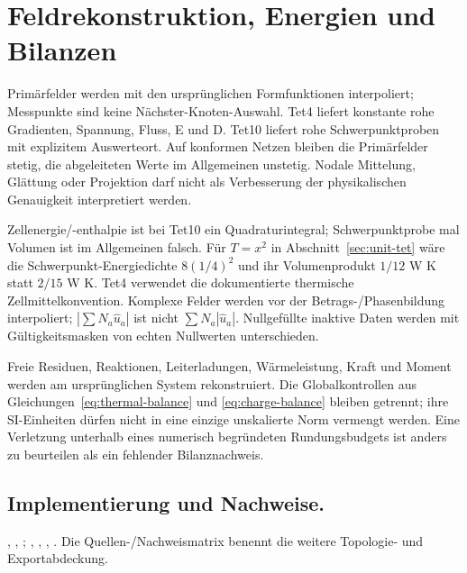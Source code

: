 \section{Feldrekonstruktion, Energien und Bilanzen}
Primärfelder werden mit den ursprünglichen Formfunktionen interpoliert;
Messpunkte sind keine Nächster-Knoten-Auswahl. Tet4 liefert konstante rohe
Gradienten, Spannung, Fluss, E und D. Tet10 liefert rohe Schwerpunktproben
mit explizitem Auswerteort. Auf konformen Netzen bleiben die Primärfelder
stetig, die abgeleiteten Werte im Allgemeinen unstetig. Nodale Mittelung,
Glättung oder Projektion darf nicht als Verbesserung der physikalischen
Genauigkeit interpretiert werden.

Zellenergie/-enthalpie ist bei Tet10 ein Quadraturintegral; Schwerpunktprobe
mal Volumen ist im Allgemeinen falsch. Für $T=x^2$ in
Abschnitt~\ref{sec:unit-tet} wäre die Schwerpunkt-Energiedichte $8(1/4)^2$
und ihr Volumenprodukt $1/12$ W K statt $2/15$ W K.
Tet4 verwendet die dokumentierte thermische Zellmittelkonvention.
Komplexe Felder werden vor der Betrags-/Phasenbildung interpoliert;
$|\sum N_a\hat u_a|$ ist nicht $\sum N_a|\hat u_a|$.
Nullgefüllte inaktive Daten werden mit Gültigkeitsmasken von echten Nullwerten
unterschieden.

Freie Residuen, Reaktionen, Leiterladungen, Wärmeleistung, Kraft und Moment
werden am ursprünglichen System rekonstruiert. Die Globalkontrollen aus
Gleichungen~\ref{eq:thermal-balance} und \ref{eq:charge-balance} bleiben
getrennt; ihre SI-Einheiten dürfen nicht in eine einzige unskalierte Norm
vermengt werden. Eine Verletzung unterhalb eines numerisch begründeten
Rundungsbudgets ist anders zu beurteilen als ein fehlender Bilanznachweis.

\subsection*{Implementierung und Nachweise.}
{\small\raggedright
{},
,
;
,
,
,
.
Die Quellen-/Nachweismatrix benennt die weitere Topologie- und Exportabdeckung.

\par}
